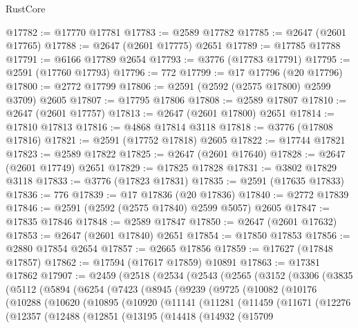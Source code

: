\begin{lexlean}{RustCore}
\begin{coremodule}
@17782 := @17770 @17781
@17783 := @2589 @17782
@17785 := @2647 (@2601 @17765)
@17788 := @2647 (@2601 @17775) @2651
@17789 := @17785 @17788
@17791 := @6166 @17789 @2654
@17793 := @3776 (@17783 @17791)
@17795 := @2591 (@17760 @17793)
@17796 := 772
@17799 := @17 @17796 (@20 @17796)
@17800 := @2772 @17799
@17806 := @2591 (@2592 (@2575 @17800) @2599 @3709) @2605
@17807 := @17795 @17806
@17808 := @2589 @17807
@17810 := @2647 (@2601 @17757)
@17813 := @2647 (@2601 @17800) @2651
@17814 := @17810 @17813
@17816 := @4868 @17814 @3118
@17818 := @3776 (@17808 @17816)
@17821 := @2591 (@17752 @17818) @2605
@17822 := @17744 @17821
@17823 := @2589 @17822
@17825 := @2647 (@2601 @17640)
@17828 := @2647 (@2601 @17749) @2651
@17829 := @17825 @17828
@17831 := @3802 @17829 @3118
@17833 := @3776 (@17823 @17831)
@17835 := @2591 (@17635 @17833)
@17836 := 776
@17839 := @17 @17836 (@20 @17836)
@17840 := @2772 @17839
@17846 := @2591 (@2592 (@2575 @17840) @2599 @5057) @2605
@17847 := @17835 @17846
@17848 := @2589 @17847
@17850 := @2647 (@2601 @17632)
@17853 := @2647 (@2601 @17840) @2651
@17854 := @17850 @17853
@17856 := @2880 @17854 @2654
@17857 := @2665 @17856
@17859 := @17627 (@17848 @17857)
@17862 := @17594 (@17617 @17859) @10891
@17863 := @17381 @17862
@17907 := @2459
    (@2518
      (@2534
        (@2543
          (@2565
            (@3152
              (@3306
                (@3835
                  (@5112
                    (@5894
                      (@6254
                        (@7423
                          (@8945
                            (@9239
                              (@9725
                                (@10082
                                  (@10176
                                    (@10288
                                      (@10620
                                        (@10895
                                          (@10920
                                            (@11141
                                              (@11281
                                                (@11459
                                                  (@11671
                                                    (@12276
                                                      (@12357
                                                        (@12488
                                                          (@12851
                                                            (@13195
                                                              (@14418
                                                                (@14932
                                                                  (@15709

\end{coremodule}
\end{lexlean}
